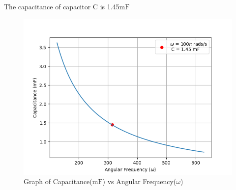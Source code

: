 \documentclass[a4,12pt,onecolumn]{IEEEtran}
\begin{document}
The capacitance of capacitor $\text{C}$ is 1.45$\text{mF}$
\begin{figure}[ht!]
\includegraphics[width=\columnwidth]{fig/fig3.png}
\caption{Graph of Capacitance($\text{mF}$) vs Angular Frequency($\omega$)}
\end{figure}
\end{document}
